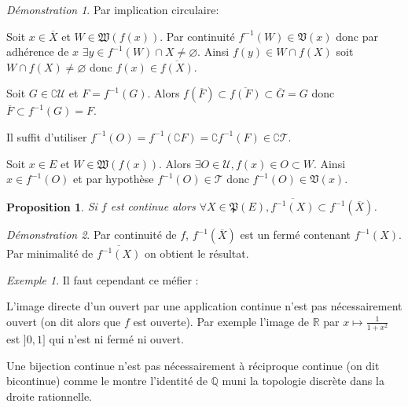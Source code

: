 \documentclass[a4paper, 11pt, french]{book}
\newenvironment{itemise}{\itemize}{\enditemize}
\theoremstyle{plain} %
\newtheorem{proposition}{Proposition}
\theoremstyle{definition} %
\theoremstyle{remark} %
\newtheorem{exemple}{Exemple}
\newtheorem*{demonstration}{Démonstration}
\newcommand{\1}{\mathds{1}}
\newcommand\vide{\varnothing}
\newcommand{\inv}[1]{#1^{-1}}
\newcommand{\Q}{\mathbb{Q}}
\newcommand{\R}{\mathbb{R}}
\begin{document}
\begin{demonstration}
	Par implication circulaire:
	\begin{itemise}
		\item Soit $x\in\overline{X}$ et $W\in\mathfrak{W}(f(x))$.
		Par continuité $\inv{f}(W)\in\mathfrak{V}(x)$ donc par adhérence de $x$ $\exists y\in\inv{f}(W)\cap X\neq\vide$.
		Ainsi $f(y)\in W\cap f(X)$ soit $W\cap f(X)\neq\vide$ donc $f(x)\in\overline{f(X)}$.
		\item Soit $G\in\complement\mathscr{U}$ et $F=\inv{f}(G)$.
		Alors $f(\overline{F})\subset\overline{f(F)}\subset\overline{G}=G$ donc $\overline{F}\subset\inv{f}(G)=F$.
		\item Il suffit d'utiliser $\inv{f}(O)=\inv{f}(\complement F)=\complement\inv{f}(F)\in\complement\mathscr{T}$.
		\item Soit $x\in E$ et $W\in\mathfrak{W}(f(x))$.
		Alors $\exists O\in\mathscr{U}, f(x)\in O\subset W$.
		Ainsi $x\in\inv{f}(O)$ et par hypothèse $\inv{f}(O)\in\mathscr{T}$ donc $\inv{f}(O)\in\mathfrak{V}(x)$.
	\end{itemise}
\end{demonstration}

\begin{proposition}
	Si $f$ est continue alors $\forall X\in\mathfrak{P}(E), \overline{\inv{f}(X)}\subset\inv{f}(\overline{X})$.
\end{proposition}

\begin{demonstration}
	Par continuité de $f$, $\inv{f}(\overline{X})$ est un fermé contenant $\inv{f}(X)$.
	Par minimalité de $\overline{\inv{f}(X)}$ on obtient le résultat.
\end{demonstration}

\begin{exemple}
	Il faut cependant ce méfier :
	\begin{itemise}
		\item L'image directe d'un ouvert par une application continue n'est pas nécessairement ouvert (on dit alors que $f$ est ouverte).
		Par exemple l'image de $\R$ par $x\mapsto\frac{1}{1+x^2}$ est $]0,1]$ qui n'est ni fermé ni ouvert.
		\item Une bijection continue n'est pas nécessairement à réciproque continue (on dit bicontinue) comme le montre l'identité de $\Q$ muni la topologie discrète dans la droite rationnelle.
	\end{itemise}
\end{exemple}
\end{document}
